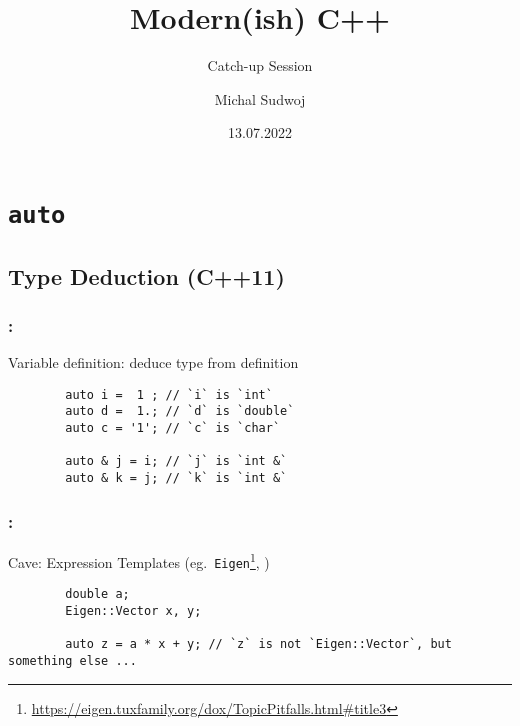 \documentclass[aspectratio=43, t]{beamer}
\author{Michal Sudwoj}
\title{Modern(ish) C++}
\subtitle{Catch-up Session}
\date{13.07.2022}
\begin{document}
\renewcommand{\fcolorbox}[4][]{#4}

\makeatletter
{}
\beamer@calculateheadfoot
\makeatother

\begin{frame}[plain, c]
	\titlepage
\end{frame}

\section*{\texorpdfstring{\texttt{auto}}{auto}}
\subsection*{Type Deduction (C++11)}
\begin{frame}[fragile]
	\frametitle{\secname: \subsecname\footnotemark[1]{}}

	Variable definition: deduce type from definition
	\begin{verbatim}
		auto i =  1 ; // `i` is `int`
		auto d =  1.; // `d` is `double`
		auto c = '1'; // `c` is `char`

		auto & j = i; // `j` is `int &`
		auto & k = j; // `k` is `int &`
	\end{verbatim}
\end{frame}

\begin{frame}[fragile]
	\frametitle{\secname: \subsecname}

	Cave: Expression Templates (eg.\ \texttt{Eigen}\footnote[1]{\url{https://eigen.tuxfamily.org/dox/TopicPitfalls.html\#title3}}, \textellipsis)
	\begin{verbatim}
		double a;
		Eigen::Vector x, y;

		auto z = a * x + y; // `z` is not `Eigen::Vector`, but something else ...
	\end{verbatim}
\end{frame}
\end{document}
